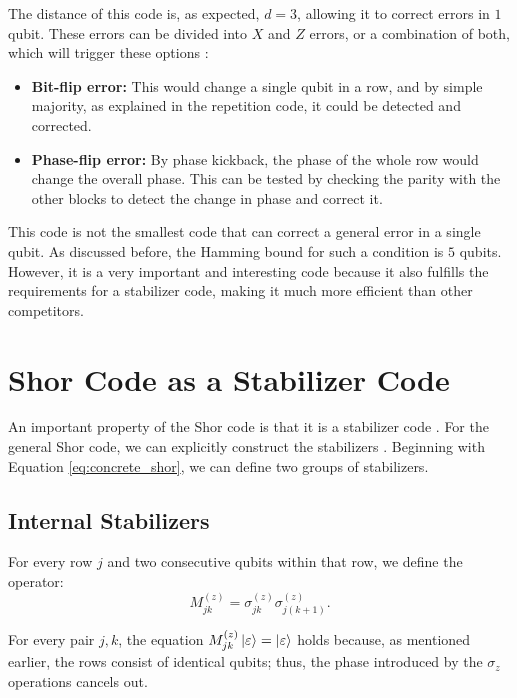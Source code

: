 The distance of this code is, as expected, $d = 3$, allowing it to correct errors in $1$ qubit. These errors can be divided into $X$ and $Z$ errors, or a combination of both, which will trigger these options \citep{Cesar2024}:
\begin{itemize}
  \item \textbf{Bit-flip error:} This would change a single qubit in a row, and by simple majority, as explained in the repetition code, it could be detected and corrected.
  \item \textbf{Phase-flip error:} By phase kickback, the phase of the whole row would change the overall phase. This can be tested by checking the parity with the other blocks to detect the change in phase and correct it.
\end{itemize}

This code is not the smallest code that can correct a general error in a single qubit. As discussed before, the Hamming bound for such a condition is $5$ qubits. However, it is a very important and interesting code because it also fulfills the requirements for a stabilizer code, making it much more efficient than other competitors.

\section{Shor Code as a Stabilizer Code}

An important property of the Shor code is that it is a stabilizer code \citep{Kitaev2002}. For the general Shor code, we can explicitly construct the stabilizers \citep{Cesar2024}. Beginning with Equation \ref{eq:concrete_shor}, we can define two groups of stabilizers.

\subsection{Internal Stabilizers}

For every row $j$ and two consecutive qubits within that row, we define the operator:
\begin{equation}
  M_{jk}^{(z)} = \sigma_{jk}^{(z)} \sigma_{j(k + 1)}^{(z)}
  \label{eq:internal_stabilizer}
.\end{equation}
\citep{Cesar2024}

For every pair $j, k$, the equation $M_{jk}^{(z)} \ket{\varepsilon} = \ket{\varepsilon}$ holds because, as mentioned earlier, the rows consist of identical qubits; thus, the phase introduced by the $\sigma_z$ operations cancels out.

